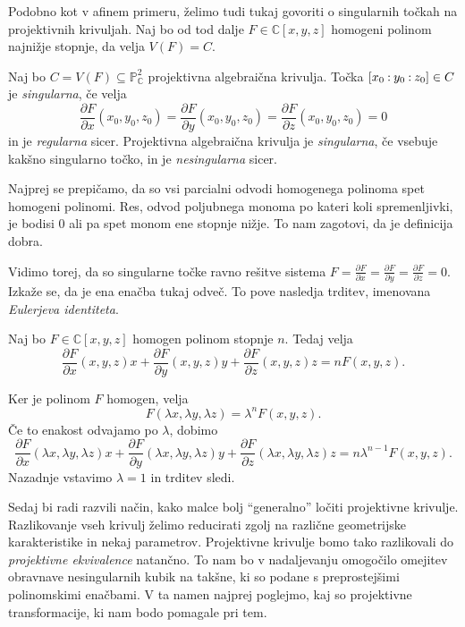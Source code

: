 \documentclass[mat1]{fmfdelo}
\numberwithin{equation}{section}
\newcommand{\C}{\mathbb C}
\newcommand{\PC}{\mathbb{P}^2_\C}
\newcommand{\Cxyz}{\C[x,y,z]}
\newcommand{\pcoor}[1]{%
\begingroup\lccode`~=`: \lowercase{\endgroup
\edef~}{\mathbin{\mathchar\the\mathcode`:}\nobreak}%
\left[%
\begingroup
\mathcode`:=\string"8000
#1%
\endgroup
\right]%
}
\newcommand{\pdv}[2][]{\frac{\partial#1}{\partial#2}}
\theoremstyle{definition}
\begin{document}
Podobno kot v afinem primeru, želimo tudi tukaj govoriti o singularnih točkah na projektivnih krivuljah. Naj bo od tod dalje $F \in \C[x,y,z]$ homogeni polinom najnižje stopnje, da velja $V(F) = C$.

\begin{definicija}
    Naj bo $C = V(F) \subseteq \PC$ projektivna algebraična krivulja. Točka $\pcoor{x_0:y_0:z_0} \in C$ je \emph{singularna}, če velja
    \[
        \pdv[F]{x}(x_0, y_0, z_0) = \pdv[F]{y}(x_0, y_0, z_0) = \pdv[F]{z}(x_0, y_0, z_0) = 0
    \]
    in je \emph{regularna} sicer. Projektivna algebraična krivulja je \emph{singularna}, če vsebuje kakšno singularno točko, in je \emph{nesingularna} sicer.
\end{definicija}

Najprej se prepičamo, da so vsi parcialni odvodi homogenega polinoma spet homogeni polinomi. Res, odvod poljubnega monoma po kateri koli spremenljivki, je bodisi $0$ ali pa spet monom ene stopnje nižje. To nam zagotovi, da je definicija dobra.

Vidimo torej, da so singularne točke ravno rešitve sistema $F = \pdv[F]{x}= \pdv[F]{y} = \pdv[F]{z} = 0$.
Izkaže se, da je ena enačba tukaj odveč. To pove nasledja trditev, imenovana \emph{Eulerjeva identiteta}.

\begin{trditev}
    Naj bo $F \in \Cxyz$ homogen polinom stopnje $n$. Tedaj velja
    \[
        \pdv[F]{x}(x,y,z)x + \pdv[F]{y}(x,y,z)y + \pdv[F]{z}(x,y,z)z = nF(x,y,z). 
    \]
\end{trditev}

\begin{dokaz}
    Ker je polinom $F$ homogen, velja 
    \[
        F(\lambda x, \lambda y, \lambda z) = \lambda^n F(x,y,z).
    \]
    Če to enakost odvajamo po $\lambda$, dobimo
    \[
        \pdv[F]{x}(\lambda x,\lambda y,\lambda z)x + 
        \pdv[F]{y}(\lambda x,\lambda y,\lambda z) y + 
        \pdv[F]{z}(\lambda x,\lambda y,\lambda z) z = n\lambda^{n-1}F(x,y,z).
    \]
    Nazadnje vstavimo $\lambda = 1$ in trditev sledi.
\end{dokaz}

Sedaj bi radi razvili način, kako malce bolj ``generalno'' ločiti projektivne krivulje. Razlikovanje vseh krivulj želimo reducirati zgolj na različne geometrijske karakteristike in nekaj parametrov. 
Projektivne krivulje bomo tako razlikovali do \emph{projektivne ekvivalence} natančno. 
To nam bo v nadaljevanju omogočilo omejitev obravnave nesingularnih kubik na takšne, ki so podane s preprostejšimi polinomskimi enačbami.
V ta namen najprej poglejmo, kaj so projektivne transformacije, ki nam bodo pomagale pri tem.
\end{document}
